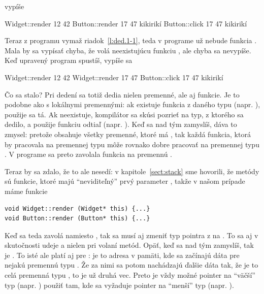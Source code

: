 vypíše 

\begin{outputBox}
Widget::render 12 42
Button::render 17 47 kikirikí
Button::click 17 47 kikirikí
\end{outputBox}

Teraz z programu vymaž riadok~\ref{l:ded.1-1}, 
teda v programe už nebude funkcia . Mala by sa vypísať chyba, že 
 volá neexistujúcu funkciu , ale chyba sa nevypíše.
Keď upravený program spustíš, vypíše sa

\begin{outputBox}
Widget::render 12 42
Widget::render 17 47
Button::click 17 47 kikirikí
\end{outputBox}

Čo sa stalo? Pri dedení sa totiž dedia nielen premenné, ale aj funkcie. Je to podobne ako
s lokálnymi premennými: ak existuje funkcia z daného typu (napr. ),
použije sa tá. Ak neexistuje, kompilátor sa skúsi pozrieť na typ, z ktorého sa dedilo,
a použije funkciu odtiaľ
(napr. ). Keď sa nad tým zamyslíš, dáva to zmysel: pretože
 obsahuje všetky premenné, ktoré má , tak každá funkcia, ktorá
by pracovala na premennej typu  môže rovnako dobre pracovať na premennej
typu . V programe sa preto zavolala funkcia  na
premennú .

Teraz by sa zdalo, že to ale nesedí: v kapitole~\ref{sect:stack} sme hovorili, 
že metódy sú funkcie, ktoré majú ``neviditeľný'' prvý parameter , takže 
v našom prípade máme funkcie

\begin{lstlisting}
void Widget::render (Widget* this) {...}
void Button::render (Button* this) {...}
\end{lstlisting}

Keď sa teda zavolá  namiesto , tak sa 
musí aj zmeniť typ pointra z  na . To sa aj v skutočnosti udeje
a nielen pri volaní metód. Opäť, keď sa nad tým zamyslíš, tak  je
.
To isté ale platí aj pre : je to adresa v pamäti, kde sa začínajú dáta
pre nejakú premennú typu . Že za nimi sa potom nachádzajú ďalšie dáta tak,
že je to celá premenná typu , to je už druhá vec.
Preto je vždy možné pointer na ``väčší'' typ (napr. ) použiť tam, kde
sa vyžaduje pointer na ``menší'' typ (napr. ).

